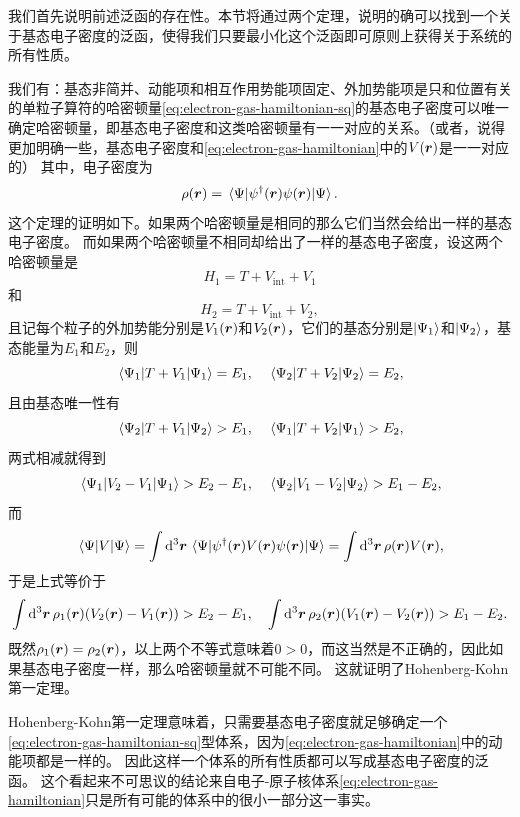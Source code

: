 我们首先说明前述泛函的存在性。本节将通过两个定理，说明的确可以找到一个关于基态电子密度的泛函，使得我们只要最小化这个泛函即可原则上获得关于系统的所有性质。

我们有：基态非简并、动能项和相互作用势能项固定、外加势能项是只和位置有关的单粒子算符的哈密顿量\eqref{eq:electron-gas-hamiltonian-sq}的基态电子密度可以唯一确定哈密顿量，即基态电子密度和这类哈密顿量有一一对应的关系。（或者，说得更加明确一些，基态电子密度和\eqref{eq:electron-gas-hamiltonian}中的$V(\vb*{r})$是一一对应的）
其中，电子密度为
\begin{equation}
    \rho(\vb*{r}) = \mel{\Psi}{{\psi}^\dagger(\vb*{r}) {\psi}(\vb*{r})}{\Psi}.
\end{equation}
这个定理的证明如下。如果两个哈密顿量是相同的那么它们当然会给出一样的基态电子密度。
而如果两个哈密顿量不相同却给出了一样的基态电子密度，设这两个哈密顿量是
\[
    {H}_1 = {T} + {V}_\text{int} + {V}_1
\]
和
\[
    {H}_2 = {T} + {V}_\text{int} + {V}_2,
\]
且记每个粒子的外加势能分别是$V_1(\vb*{r})$和$V_2(\vb*{r})$，它们的基态分别是$\ket{\Psi_1}$和$\ket{\Psi_2}$，基态能量为$E_1$和$E_2$，则
\[
    \mel{\Psi_1}{{T} + {V}_1}{\Psi_1} = E_1, \quad \mel{\Psi_2}{{T} + {V}_2}{\Psi_2} = E_2,
\]
且由基态唯一性有
\[
    \mel{\Psi_2}{{T} + {V}_1}{\Psi_2} > E_1, \quad \mel{\Psi_1}{{T} + {V}_2}{\Psi_1} > E_2,
\]
两式相减就得到
\[
    \mel{\Psi_1}{{V}_2 - {V}_1}{\Psi_1} > E_2 - E_1, \quad \mel{\Psi_2}{{V}_1 - {V}_2}{\Psi_2} > E_1 - E_2,
\]
而
\[
    \mel{\Psi}{{V}}{\Psi} = \int \dd[3]{\vb*{r}} \mel{\Psi}{{\psi}^\dagger(\vb*{r}) V(\vb*{r}) {\psi}(\vb*{r})}{\Psi} = \int \dd[3]{\vb*{r}} \rho(\vb*{r}) V(\vb*{r}),
\]
于是上式等价于
\[
    \int \dd[3]{\vb*{r}} \rho_1(\vb*{r}) (V_2(\vb*{r}) - V_1(\vb*{r})) > E_2 - E_1, \quad \int \dd[3]{\vb*{r}} \rho_2(\vb*{r}) (V_1(\vb*{r}) - V_2(\vb*{r})) > E_1 - E_2.
\]
既然$\rho_1(\vb*{r}) = \rho_2(\vb*{r})$，以上两个不等式意味着$0 > 0$，而这当然是不正确的，因此如果基态电子密度一样，那么哈密顿量就不可能不同。
这就证明了Hohenberg-Kohn第一定理。

Hohenberg-Kohn第一定理意味着，只需要基态电子密度就足够确定一个\eqref{eq:electron-gas-hamiltonian-sq}型体系，因为\eqref{eq:electron-gas-hamiltonian}中的动能项都是一样的。
因此这样一个体系的所有性质都可以写成基态电子密度的泛函。
这个看起来不可思议的结论来自电子-原子核体系\eqref{eq:electron-gas-hamiltonian}只是所有可能的体系中的很小一部分这一事实。

